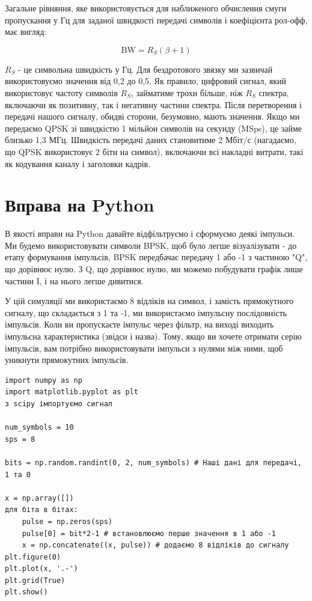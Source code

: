 Загальне рівняння, яке використовується для наближеного обчислення смуги
пропускання у Гц для заданої швидкості передачі символів і коефіцієнта
рол-офф, має вигляд:

\[\mathrm{BW} = R_S(\beta + 1)\]

\(R_S\) - це символьна швидкість у Гц. Для бездротового
зв\textquotesingle язку ми зазвичай використовуємо значення від 0,2 до
0,5. Як правило, цифровий сигнал, який використовує частоту символів
\(R_S\), займатиме трохи більше, ніж \(R_S\) спектра, включаючи як
позитивну, так і негативну частини спектра. Після перетворення і
передачі нашого сигналу, обидві сторони, безумовно, мають значення. Якщо
ми передаємо QPSK зі швидкістю 1 мільйон символів на секунду (MSps), це
займе близько 1,3 МГц. Швидкість передачі даних становитиме 2 Мбіт/с
(нагадаємо, що QPSK використовує 2 біти на символ), включаючи всі
накладні витрати, такі як кодування каналу і заголовки кадрів.

\section{Вправа на
Python}\label{ux432ux43fux440ux430ux432ux430-ux43dux430-python}

В якості вправи на Python давайте відфільтруємо і сформуємо деякі
імпульси. Ми будемо використовувати символи BPSK, щоб було легше
візуалізувати - до етапу формування імпульсів, BPSK передбачає передачу
1 або -1 з частиною "Q", що дорівнює нулю. З Q, що дорівнює нулю, ми
можемо побудувати графік лише частини I, і на нього легше дивитися.

У цій симуляції ми використаємо 8 відліків на символ, і замість
прямокутного сигналу, що складається з 1 та -1, ми використаємо
імпульсну послідовність імпульсів. Коли ви пропускаєте імпульс через
фільтр, на виході виходить імпульсна характеристика (звідси і назва).
Тому, якщо ви хочете отримати серію імпульсів, вам потрібно
використовувати імпульси з нулями між ними, щоб уникнути прямокутних
імпульсів.

\begin{Verbatim}[breaklines=true,breakanywhere=true,fontsize=\small]
import numpy as np
import matplotlib.pyplot as plt
з scipy імпортуємо сигнал

num_symbols = 10
sps = 8

bits = np.random.randint(0, 2, num_symbols) # Наші дані для передачі, 1 та 0

x = np.array([])
для біта в бітах:
    pulse = np.zeros(sps)
    pulse[0] = bit*2-1 # встановлюємо перше значення в 1 або -1
    x = np.concatenate((x, pulse)) # додаємо 8 відліків до сигналу
plt.figure(0)
plt.plot(x, '.-')
plt.grid(True)
plt.show()
\end{Verbatim}

